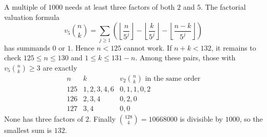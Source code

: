 A multiple of $1000$ needs at least three factors of both $2$ and $5$. The factorial valuation formula
\[
v_5\binom nk=\sum_{j\ge1}\left(\left\lfloor\dfrac{n}{5^j}\right\rfloor-\left\lfloor\dfrac{k}{5^j}\right\rfloor-\left\lfloor\dfrac{n-k}{5^j}\right\rfloor\right)
\]
has summands $0$ or $1$. Hence $n<125$ cannot work. If $n+k<132$, it remains to check $125\le n\le130$ and $1\le k\le131-n$. Among these pairs, those with $v_5\binom nk\ge3$ are exactly
\[
\begin{array}{c|l|l}
n&k&v_2\binom nk\text{ in the same order}\\\hline
125&1,2,3,4,6&0,1,1,0,2\\
126&2,3,4&0,2,0\\
127&3,4&0,0
\end{array}
\]
None has three factors of $2$. Finally $\binom{128}{4}=10668000$ is divisible by $1000$, so the smallest sum is $\boxed{132}$.
